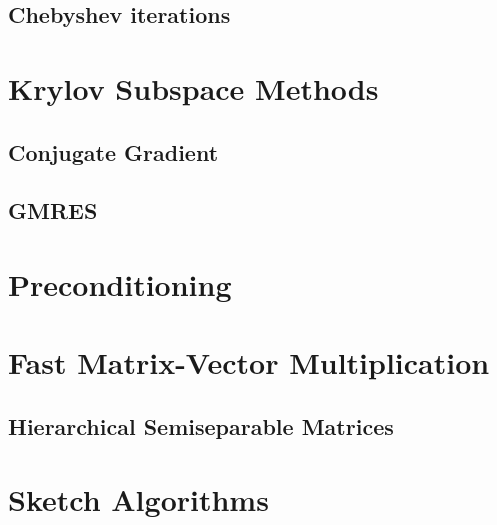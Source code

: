 \subsection{Chebyshev iterations}
\newpage
\section{Krylov Subspace Methods}
\subsection{Conjugate Gradient}
\subsection{GMRES}

\section{Preconditioning}

\section{Fast Matrix-Vector Multiplication}
\subsection{Hierarchical Semiseparable Matrices}


\section{Sketch Algorithms}

